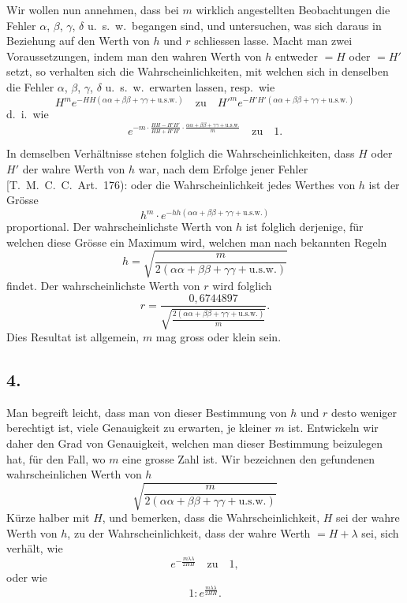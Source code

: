 \documentclass[12pt,a4paper]{article}
\begin{document}
Wir wollen nun annehmen, dass bei $m$ wirklich angestellten Beobachtungen die Fehler $\alpha$, $\beta$, $\gamma$, $\delta$ u.\ s.\ w.\ begangen sind, und untersuchen, was sich daraus in Beziehung auf den Werth von $h$ und $r$ schliessen lasse. Macht man zwei Voraussetzungen, indem man den wahren Werth von $h$ entweder $= H$ oder $= H'$ setzt, so verhalten sich die Wahrscheinlichkeiten, mit welchen sich in denselben die Fehler $\alpha$, $\beta$, $\gamma$, $\delta$ u.\ s.\ w.\ erwarten lassen, resp.\ wie
\[
H^{m}e^{-HH(\alpha\alpha+\beta\beta+\gamma\gamma+\text{u.s.w.})}
\quad\text{zu}\quad
H'^{m}e^{-H'H'(\alpha\alpha+\beta\beta+\gamma\gamma+\text{u.s.w.})}
\]
d.\ i.\ wie
\[
e^{-m\cdot\frac{HH-H'H'}{HH+H'H'}\cdot\frac{\alpha\alpha+\beta\beta+\gamma\gamma+\text{u.s.w.}}{m}}
\quad\text{zu}\quad 1.
\]

In demselben Verh\"altnisse stehen folglich die Wahrscheinlichkeiten, dass $H$ oder $H'$ der wahre Werth von $h$ war, nach dem Erfolge jener Fehler [T.\ M.\ C.\ C.\ Art.\ 176): oder die Wahrscheinlichkeit jedes Werthes von $h$ ist der Gr\"osse
\[
h^{m} \cdot e^{-hh(\alpha\alpha+\beta\beta+\gamma\gamma+\text{u.s.w.})}
\]
proportional. Der wahrscheinlichste Werth von $h$ ist folglich derjenige, f\"ur welchen diese Gr\"osse ein Maximum wird, welchen man nach bekannten Regeln
\[
h = \sqrt{\frac{m}{2(\alpha\alpha+\beta\beta+\gamma\gamma+\text{u.s.w.})}}
\]
findet. Der wahrscheinlichste Werth von $r$ wird folglich
\[
r = \frac{0{,}6744897}{\sqrt{\frac{2(\alpha\alpha+\beta\beta+\gamma\gamma+\text{u.s.w.})}{m}}}.
\]
Dies Resultat ist allgemein, $m$ mag gross oder klein sein.

\subsection*{4.}

Man begreift leicht, dass man von dieser Bestimmung von $h$ und $r$ desto weniger berechtigt ist, viele Genauigkeit zu erwarten, je kleiner $m$ ist. Entwickeln wir daher den Grad von Genauigkeit, welchen man dieser Bestimmung beizulegen hat, f\"ur den Fall, wo $m$ eine grosse Zahl ist. Wir bezeichnen den gefundenen wahrscheinlichen Werth von $h$
\[
\sqrt{\frac{m}{2(\alpha\alpha+\beta\beta+\gamma\gamma+\text{u.s.w.})}}
\]
K\"urze halber mit $H$, und bemerken, dass die Wahrscheinlichkeit, $H$ sei der wahre Werth von $h$, zu der Wahrscheinlichkeit, dass der wahre Werth $= H + \lambda$ sei, sich verh\"alt, wie
\[
e^{-\frac{m\lambda\lambda}{2HH}} \quad\text{zu}\quad 1,
\]
oder wie
\[
1 : e^{\frac{m\lambda\lambda}{2HH}}.
\]
\end{document}
